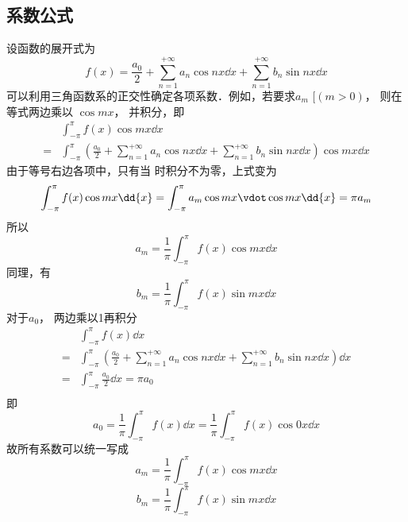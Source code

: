 \subsection{系数公式}

设函数的展开式为
\begin{equation}
f( x ) = \frac{{{a_0}}}{2} + \sum\limits_{n = 1}^{ + \infty } {{a_n}\cos nx \dd{x}} + \sum\limits_{n = 1}^{ + \infty } {{b_n}\sin nx \dd{x}} 
\end{equation}
可以利用三角函数系的正交性确定各项系数．例如，若要求${a_m}$ $[(m > 0)$， 则在等式两边乘以 $\cos mx$， 并积分，即
\begin{equation}\begin{split}
&\int_{ - \pi }^\pi f( x )\cos mx \dd{x}\\ 
= &\int_{ - \pi }^\pi {(\frac{{{a_0}}}{2} + \sum\limits_{n = 1}^{ + \infty } {{a_n}\cos nx \dd{x}} + \sum\limits_{n = 1}^{ + \infty } {{b_n}\sin nx \dd{x}} )\cos mx \dd{x}}
\end{split}\end{equation}
由于等号右边各项中，只有当 时积分不为零，上式变为
\begin{equation}
\int_{-\pi }^\pi f( x )\cos mx \dd{x} = \int_{-\pi }^\pi {a_m}\cos mx \vdot \cos mx \dd{x} = \pi a_m
\end{equation}
所以
\begin{equation}
{a_m} = \frac{1}{\pi }\int_{-\pi }^\pi f( x )\cos mx \dd{x}
\end{equation}
同理，有
\begin{equation}
b_m = \frac{1}{\pi} \int_{-\pi }^\pi f( x )\sin mx \dd{x}
\end{equation}
对于$a_0$， 两边乘以1再积分
\begin{equation}\begin{aligned}
&\int_{-\pi}^\pi f(x) \dd{x}\\  
= &\int_{-\pi}^\pi  (\frac{a_0}{2} + \sum\limits_{n = 1}^{+\infty} {a_n}\cos nx \dd{x}  + \sum\limits_{n=1}^{+\infty} {b_n}\sin nx \dd{x}) \dd{x} \\
= &\int_{-\pi }^\pi  \frac{{{a_0}}}{2} \dd{x}  = \pi {a_0}\\
\end{aligned}\end{equation}
即
\begin{equation}
{a_0} = \frac{1}{\pi }\int_{-\pi }^\pi f( x ) \dd{x} = \frac{1}{\pi }\int_{ - \pi }^\pi f( x )\cos 0x \dd{x}
\end{equation}
故所有系数可以统一写成
\begin{equation}
a_m = \frac{1}{\pi }\int_{ - \pi }^\pi  f( x )\cos mx \dd{x}
\end{equation}
\begin{equation}
b_m = \frac{1}{\pi }\int_{ - \pi }^\pi f( x )\sin mx \dd{x}
\end{equation}

